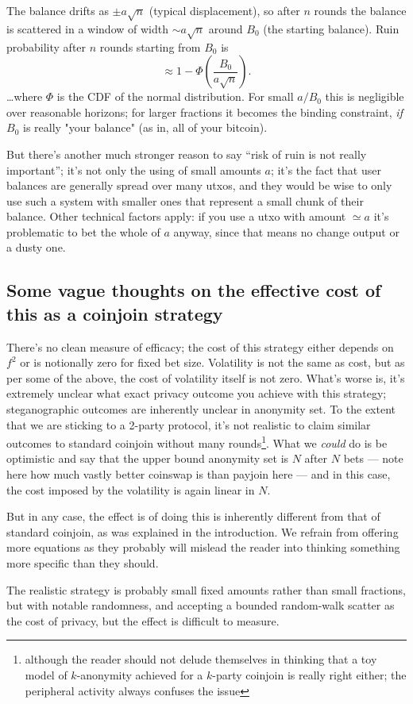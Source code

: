 \documentclass[11pt]{article}
\begin{document}
 The
balance drifts as $\pm a\sqrt{n}$ (typical displacement), so after $n$ rounds
the balance is scattered in a window of width $\sim a\sqrt{n}$ around $B_0$ (the starting balance). Ruin probability after $n$ rounds starting from $B_0$ is
$$
\approx 1 - \Phi\!\left(\frac{B_0}{a\sqrt{n}}\right).
$$
\ldots where $\Phi$ is the CDF of the normal distribution. For small $a/B_0$ this is negligible over reasonable horizons; for larger fractions it becomes the binding constraint, \emph{if} $B_0$ is really "your balance" (as in, all of your bitcoin).

But there's another much stronger reason to say ``risk of ruin is not really important''; it's not only the using of small amounts $a$; it's the fact that user balances are generally spread over many utxos, and they would be wise to only use such a system with smaller ones that represent a small chunk of their balance. Other technical factors apply: if you use a utxo with amount $\simeq a$ it's problematic to bet the whole of $a$ anyway, since that means no change output or a dusty one.

\subsection{Some vague thoughts on the effective cost of this as a coinjoin strategy}

There's no clean measure of efficacy; the cost of this strategy either depends on $f^2$ or is notionally zero for fixed bet size. Volatility is not the same as cost, but as per some of the above, the cost of volatility itself is not zero. What's worse is, it's extremely unclear what exact privacy outcome you achieve with this strategy; steganographic outcomes are inherently unclear in anonymity set. To the extent that we are sticking to a 2-party protocol, it's not realistic to claim similar outcomes to standard coinjoin without many rounds\footnote{although the reader should not delude themselves in thinking that a toy model of $k$-anonymity achieved for a $k$-party coinjoin is really right either; the peripheral activity always confuses the issue}. What we \emph{could} do is be optimistic and say that the upper bound anonymity set is $N$ after $N$ bets --- note here how much vastly better coinswap is than payjoin here --- and in this case, the cost imposed by the volatility is again linear in $N$.

But in any case, the effect is of doing this is inherently different from that of standard coinjoin, as was explained in the introduction. We refrain from offering more equations as they probably will mislead the reader into thinking something more specific than they should.

The realistic strategy is probably small fixed amounts rather than small fractions, but with notable randomness, and accepting a bounded random-walk scatter as the cost of privacy, but the effect is difficult to measure.
\end{document}
